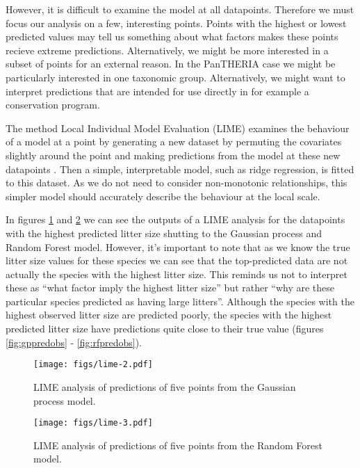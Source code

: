 \documentclass[10pt,]{article}
\begin{document}
However, it is difficult to examine the model at all datapoints. Therefore we must focus our analysis on a few, interesting points. Points with the highest or lowest predicted values may tell us something about what factors makes these points recieve extreme predictions. Alternatively, we might be more interested in a subset of points for an external reason. In the PanTHERIA case we might be particularly interested in one taxonomic group. Alternatively, we might want to interpret predictions that are intended for use directly in for example a conservation program.

The method Local Individual Model Evaluation (LIME) examines the behaviour of a model at a point by generating a new dataset by permuting the covariates slightly around the point and making predictions from the model at these new datapoints \citetext{\citealp{lime}; \citealp{ribeiro2016should}; \citealp[ ]{lundberg2017unified}; \citealp{ribeiro2016nothing}}. Then a simple, interpretable model, such as ridge regression, is fitted to this dataset. As we do not need to consider non-monotonic relationships, this simpler model should accurately describe the behaviour at the local scale.

In figures \ref{fig:limegp} and \ref{fig:limerf} we can see the outputs of a LIME analysis for the datapoints with the highest predicted litter size shutting to the Gaussian process and Random Forest model. However, it's important to note that as we know the true litter size values for these species we can see that the top-predicted data are not actually the species with the highest litter size. This reminds us not to interpret these as ``what factor imply the highest litter size'' but rather ``why are these particular species predicted as having large litters''. Although the species with the highest observed litter size are predicted poorly, the species with the highest predicted litter size have predictions quite close to their true value (figures \ref{fig:gppredobs} - \ref{fig:rfpredobs}).

\begin{figure}[htbp]
\centering
\texttt{[image: figs/lime-2.pdf]}
\caption{LIME analysis of predictions of five points from the Gaussian process model.\protect\label{fig:limegp}}
\end{figure}

\begin{figure}[htbp]
\centering
\texttt{[image: figs/lime-3.pdf]}
\caption{LIME analysis of predictions of five points from the Random Forest model.\protect\label{fig:limerf}}
\end{figure}
\end{document}
